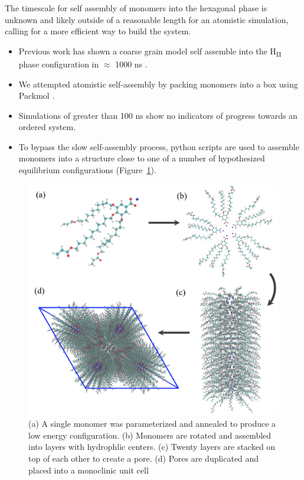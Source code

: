 \documentclass{article}
\begin{document}
  The timescale for self assembly of monomers into the hexagonal phase is
  unknown and likely outside of a reasonable length for an atomistic
  simulation, calling for a more efficient way to build the system. 
  \begin{itemize}
    \item Previous work has shown a coarse grain model self assemble into
    the H\textsubscript{II} phase configuration in $\approx$ 1000 ns \cite{mondal_self-assembly_2013}.
    \item We attempted atomistic self-assembly by packing monomers into a box 
    using Packmol \cite{martinez_packmol:_2009}.
    \item Simulations of greater than 100 ns show no indicators of progress 
    towards an ordered system.  %
    \item To bypass the slow self-assembly process, python scripts are used
    to assemble monomers into a structure close to one of a number of 
    hypothesized equilibrium configurations (Figure~\ref{fig:python}).
  \end{itemize}

  \begin{figure}
	\centering
	\includegraphics[width=0.75\linewidth]{build.PNG} %
	\caption{(a) A single monomer was parameterized and annealed to produce a low energy
		configuration. (b) Monomers are rotated and assembled into layers with 
		hydrophlic centers. (c) Twenty layers are stacked on top of each other to create
		a pore. (d) Pores are duplicated and placed into a monoclinic unit cell}\label{fig:python}
  \end{figure}
  
\end{document}
